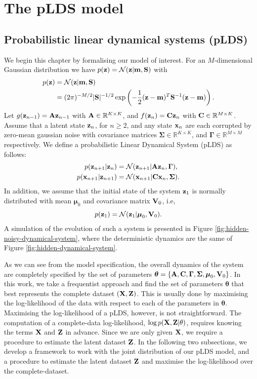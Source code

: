 \documentclass[12pt, oneside]{book}
\numberwithin{equation}{section}
\newcommand{\x}{{\bf x}}
\newcommand{\X}{{\bf X}}
\newcommand{\z}{{\bf z}}
\newcommand{\Z}{{\bf Z}}
\newcommand{\N}{\mathcal{N}}
\newcommand{\R}{\mathbb{R}}
\begin{document}
{\chapter{The pLDS model}
\section{Probabilistic linear dynamical systems (pLDS)}
We begin this chapter by formalising our model of interest. For an $M$-dimensional Gaussian distribution we have $p(\z) = \mathcal{N}(\z \vert {\bf m}, {\bf S})$ with
\begin{align}
	p(\z) &= \N(\z \vert {\bf m}, {\bf S})\\
		  &= (2\pi)^{-M/2} \vert {\bf S}\vert^{-1/2}\exp\left(-\frac{1}{2}(\z - {\bf m})^T{\bf S}^{-1}(\z - {\bf m})\right).
\end{align}
Let $g(\z_{n-1}) = {\bf A} \z_{n-1}$ with ${\bf A}\in\R^{K\times K}$, and $f(\z_n) = {\bf C} \z_{n}$ with ${\bf C} \in \R^{M \times K}$. 
Assume that a latent state $\z_n$, for $n \geq 2$, and any state $\x_n$ are each corrupted by zero-mean gaussian noise with covariance matrices $\boldsymbol{\Sigma} \in \mathbb{R}^{K \times K}$, and $\boldsymbol{\Gamma} \in \mathbb{R}^{M \times M}$ respectively. We define a  probabilistic Linear Dynamical System (pLDS) as follows:
\begin{align}
	p(\z_{n+1} \vert \z_n) &= \N(\z_{n+1} \vert {\bf A}\z_n, \boldsymbol\Gamma),\\
	p(\x_{n+1} \vert \z_{n+1}) &= \N(\x_{n+1} \vert {\bf C}\x_n, \boldsymbol\Sigma).
\end{align}
In addition, we assume that the initial state of the system $\z_1$ is normally distributed with mean $\boldsymbol{\mu}_0$ and covariance matrix ${\bf V}_0$, i.e,
\begin{equation}
	p(\z_1) = \N(\z_1 \vert \boldsymbol\mu_0, {\bf V}_0).
\end{equation}
A simulation of the evolution of such a system is presented in Figure \ref{fig:hidden-noisy-dynamical-system}, where the deterministic dynamics are the same of Figure \ref{fig:hidden-dynamical-system}.

\sloppy As we can see from the model specification, the overall dynamics of the system are completely specified by the set of parameters $\boldsymbol\theta = \{{\bf A}, {\bf C}, \boldsymbol\Gamma, \boldsymbol\Sigma, \boldsymbol\mu_0, {\bf V}_0\}$. In this work, we take a frequentist approach and find the set of parameters $\boldsymbol\theta$ that best represents the complete dataset $(\X, \Z)$. This is usually done by maximising the log-likelihood of the data with respect to each of the parameters in $\boldsymbol{\theta}$. Maximising the log-likelihood of a pLDS, however, is not straightforward. The computation of a complete-data log-likelihood, $\log p(\X, \Z \vert \theta)$, requires knowing the terms $\X$ and $\Z$ in advance. Since we are only given $\X$, we require a procedure to estimate the latent dataset $\Z$. In the following two subsections, we develop a framework to work with the joint distribution of our pLDS model, and a procedure to estimate the latent dataset $\Z$ and maximise the log-likelihood over the complete-dataset.


}
\end{document}
